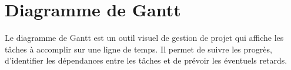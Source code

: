 \section{Diagramme de Gantt}
Le diagramme de Gantt est un outil visuel de gestion de projet qui affiche les
tâches à accomplir sur une ligne de temps. Il permet de suivre les progrès,
d’identifier les dépendances entre les tâches et de prévoir les éventuels retards.

\newpage
%
%
%
%


